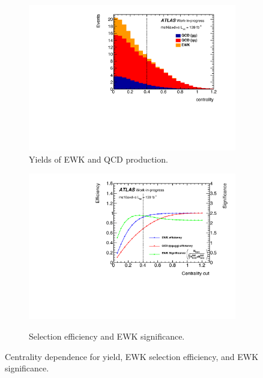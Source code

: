 \begin{figure}[!htbp]
\begin{subfigure}{.48\textwidth}
  \centering
  \includegraphics[width=.95\linewidth]{figures/AnalysisOverview/centrality_Dist.pdf}  
  \caption{Yields of EWK and QCD production.}
  \label{fig:centrality_a}
\end{subfigure}
\begin{subfigure}{.48\textwidth}
  \centering
  \includegraphics[width=.9\linewidth]{figures/AnalysisOverview/centrality_Cut.pdf}  \\
  \caption{Selection efficiency and EWK significance. }
  \label{fig:centrality_b}
\end{subfigure}
\caption{Centrality dependence for yield, EWK selection efficiency, and EWK significance. }
\end{figure}

